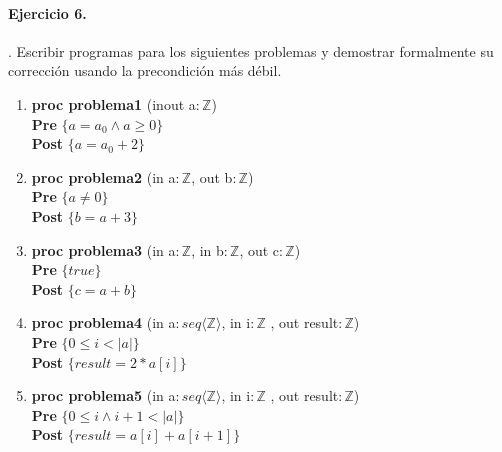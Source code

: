 \documentclass{article}
\begin{document}
\paragraph{Ejercicio 6.}. Escribir programas para los siguientes problemas y demostrar 
formalmente su corrección usando la precondición
más débil.

\begin{enumerate}[label=\alph*)]
\item \textbf{proc problema1 }(inout a$:\mathbb{Z}$) {\\
   \hspace*{6mm} \textbf{Pre }$\{a = a_0 \wedge a \geq 0\}$\\
   \hspace*{6mm} \textbf{Post }$\{a = a_0 + 2\}$\\
   }

\item \textbf{proc problema2 }(in a$:\mathbb{Z}$, out b$:\mathbb{Z}$) {\\
   \hspace*{6mm} \textbf{Pre }$\{a \neq 0\}$\\
   \hspace*{6mm} \textbf{Post }$\{b = a + 3\}$\\
   }

\item \textbf{proc problema3 }(in a$:\mathbb{Z}$, in b$:\mathbb{Z}$, out c$:\mathbb{Z}$) {\\
   \hspace*{6mm} \textbf{Pre }$\{true\}$\\
   \hspace*{6mm} \textbf{Post }$\{c = a + b\}$\\
   }

\item \textbf{proc problema4 }(in a$: seq\langle \mathbb{Z}\rangle$, in i$:\mathbb{Z}$
	, out result$: \mathbb{Z}$) {\\
   \hspace*{6mm} \textbf{Pre }$\{0 \leq i < |a|\}$\\
   \hspace*{6mm} \textbf{Post }$\{result = 2 * a[i]\}$\\
   }

\item \textbf{proc problema5 }(in a$: seq\langle \mathbb{Z}\rangle$, in i$:\mathbb{Z}$
	, out result$: \mathbb{Z}$) {\\
   \hspace*{6mm} \textbf{Pre }$\{0 \leq i \wedge i + 1 < |a|\}$\\
   \hspace*{6mm} \textbf{Post }$\{result = a[i] + a[i + 1]\}$\\
   }
\end{enumerate}
\end{document}
